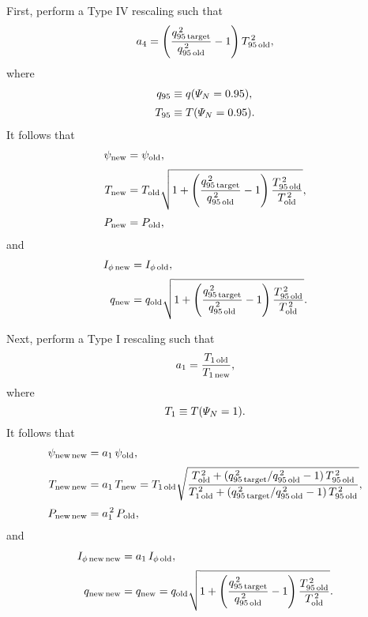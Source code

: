 \documentclass[12pt]{article}
\begin{document}
First, perform a Type IV rescaling such that 
\begin{equation}
a_4= \left(\frac{q_{95\,{\rm target}}^{\,2}}{q_{95\,{\rm old}}^{\,2}}-1\right)T_{95\,{\rm old}}^{\,2},
\end{equation}
where
\begin{align}
q_{95} &\equiv q({\mit\Psi}_N=0.95),\\[0.5ex]
T_{95}&\equiv T({\mit\Psi}_N=0.95).
\end{align}
It follows that
\begin{align}
\psi_{\rm new} &= \psi_{\rm old},\\[0.5ex]
T_{\rm new} & =T_{\rm old}\sqrt{1 +\left(\frac{q_{95\,{\rm target}}^{\,2}}{q_{95\,{\rm old}}^{\,2}}-1\right)\frac{T_{95\,{\rm old}}^{\,2}}{T_{\rm old}^{\,2}}},\\[0.5ex]
P_{\rm new} &= P_{\rm old},
\end{align}
and
\begin{align}
I_{\phi\,{\rm new}} &=I_{\phi\,{\rm old}},\\[0.5ex]
q_{\rm new} &= q_{\rm old}\sqrt{1 +\left(\frac{q_{95\,{\rm target}}^{\,2}}{q_{95\,{\rm old}}^{\,2}}-1\right)\frac{T_{95\,{\rm old}}^{\,2}}{T_{\rm old}^{\,2}}}.
\end{align} 

Next, perform a Type I rescaling such that 
\begin{equation}
a_1 = \frac{T_{1\,{\rm old}}}{T_{1\,{\rm new}}},
\end{equation}
where 
\begin{equation}
T_{1}\equiv  T({\mit\Psi}_N=1).
\end{equation}
It follows that 
\begin{align}
\psi_{\rm new\,new} &= a_1\,\psi_{\rm old},\\[0.5ex]
T_{\rm new\,new} &=a_1\,T_{\rm new} = T_{1\,{\rm old}}
\sqrt{
\frac{T_{\rm old}^{\,2} + (q_{95\,{\rm target}}^{\,2}/q_{95\,{\rm old}}^{\,2}-1)\,T_{95\,{\rm old}}^{\,2}}
{T_{1\,{\rm old}}^{\,2} + (q_{95\,{\rm target}}^{\,2}/q_{95\,{\rm old}}^{\,2}-1)\,T_{95\,{\rm old}}^{\,2}}
},
\\[0.5ex]
P_{\rm new\,new} &=a_1^{\,2}\,P_{\rm old},
\end{align}
and
\begin{align}
I_{\phi\,{\rm new\,new}} &= a_1\,I_{\phi\,{\rm old}},\\[0.5ex]
q_{\rm new\,new} &= q_{\rm new}= q_{\rm old}\sqrt{1 +\left(\frac{q_{95\,{\rm target}}^{\,2}}{q_{95\,{\rm old}}^{\,2}}-1\right)\frac{T_{95\,{\rm old}}^{\,2}}{T_{\rm old}^{\,2}}}.
\end{align}
\end{document}
